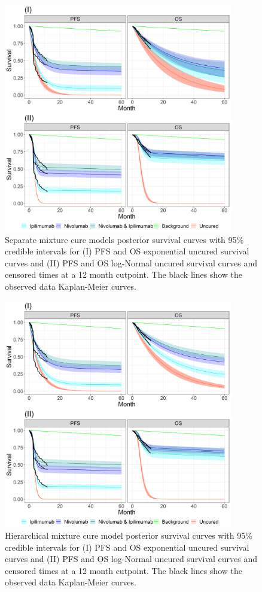 \documentclass[AMA,STIX1COL]{WileyNJD-v2}
\begin{document}

\begin{figure}[!H]
\centering
\includegraphics[height=10cm, width=0.6\linewidth]{plot_S_grid_cf_sep_cpt_12m.png}
\caption{\label{fig:S_cutpoint_12mo_sep} Separate mixture cure models posterior survival curves with 95\% credible intervals for (I) PFS and OS exponential uncured survival curves and (II) PFS and OS log-Normal uncured survival curves and censored times at a 12 month cutpoint. The black lines show the observed data Kaplan-Meier curves.}
\end{figure}

\begin{figure}[!H]
\centering
\includegraphics[height=10cm, width=0.6\linewidth]{plot_S_grid_cf_hier_cpt_12m.png}
\caption{\label{fig:S_cutpoint_12mo_hier} Hierarchical mixture cure model posterior survival curves with 95\% credible intervals for (I) PFS and OS exponential uncured survival curves and (II) PFS and OS log-Normal uncured survival curves and censored times at a 12 month cutpoint. The black lines show the observed data Kaplan-Meier curves.}
\end{figure}
\end{document}
